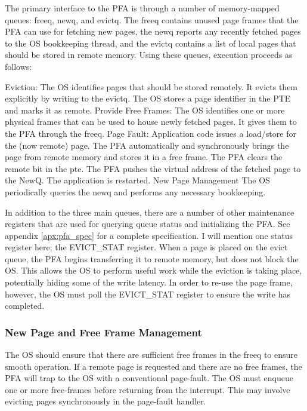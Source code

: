 The primary interface to the PFA is through a number of memory-mapped queues:
\gls{freeq}, \gls{newq}, and \gls{evictq}. The \gls{freeq} contains unused page frames that the PFA can
use for fetching new pages, the \gls{newq} reports any recently fetched pages to the
OS bookkeeping thread, and the \gls{evictq} contains a list of local pages that
should be stored in remote memory. Using these queues, execution proceeds as
follows:

\begin{outline}[enumerate]
  \1 Eviction:
      \2 The OS identifies pages that should be stored remotely.
      \2 It evicts them explicitly by writing to the \gls{evictq}.
      \2 The OS stores a page identifier in the PTE and marks it as remote.
  \1 Provide Free Frames:
      \2 The OS identifies one or more physical frames that can be used to
      house newly fetched pages.
      \2 It gives them to the PFA through the \gls{freeq}.
  \1 Page Fault:
      \2 Application code issues a load/store for the (now remote) page.
      \2 The PFA automatically and synchronously brings the page from remote
      memory and stores it in a free frame.
      \2 The PFA clears the remote bit in the \gls{pte}.
      \2 The PFA pushes the virtual address of the fetched page to the NewQ.
      \2 The application is restarted.
  \1 New Page Management
      \2 The OS periodically queries the \gls{newq} and performs any
      necessary bookkeeping.
\end{outline}

In addition to the three main queues, there are a number of other maintenance
registers that are used for querying queue status and initializing the PFA. See
appendix \ref{apx:pfa_spec} for a complete specification. I will mention one status
register here; the EVICT\_STAT register. When a page is placed on the evict
queue, the PFA begins transferring it to remote memory, but does not block
the OS. This allows the OS to perform useful work while the eviction is taking
place, potentially hiding some of the write latency. In order to re-use the
page frame, however, the OS must poll the EVICT\_STAT register to ensure the
write has completed.

\subsubsection{New Page and Free Frame Management}
The OS should ensure that there are sufficient free frames in the \gls{freeq} to
ensure smooth operation. If a remote page is requested and there are no free
frames, the PFA will trap to the OS with a conventional page-fault. The OS must
enqueue one or more free-frames before returning from the interrupt. This may
involve evicting pages synchronously in the page-fault handler.

